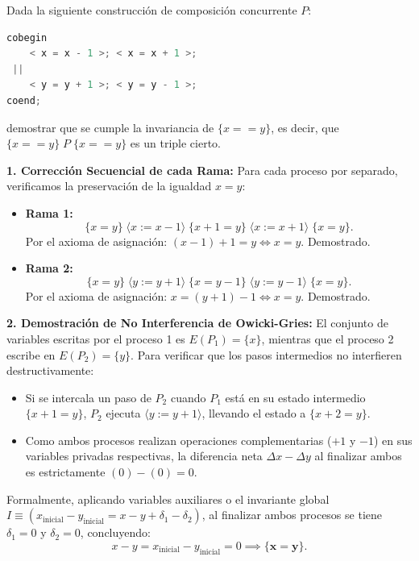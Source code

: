 \begin{ejercicio}
Dada la siguiente construcción de composición concurrente $P$:
\begin{lstlisting}[language=C++]
cobegin
    < x = x - 1 >; < x = x + 1 >;
 ||
    < y = y + 1 >; < y = y - 1 >;
coend;
\end{lstlisting}
demostrar que se cumple la invariancia de $\{x == y\}$, es decir, que $\{x == y\} \; P \; \{x == y\}$ es un triple cierto.
\end{ejercicio}

\begin{solucion}
\textbf{1. Corrección Secuencial de cada Rama:}
Para cada proceso por separado, verificamos la preservación de la igualdad $x = y$:
\begin{itemize}
    \item \textbf{Rama 1:}
    \[
    \{x = y\} \; \langle x := x - 1 \rangle \; \{x + 1 = y\} \; \langle x := x + 1 \rangle \; \{x = y\}.
    \]
    Por el axioma de asignación: $(x - 1) + 1 = y \iff x = y$. Demostrado.
    \item \textbf{Rama 2:}
    \[
    \{x = y\} \; \langle y := y + 1 \rangle \; \{x = y - 1\} \; \langle y := y - 1 \rangle \; \{x = y\}.
    \]
    Por el axioma de asignación: $x = (y + 1) - 1 \iff x = y$. Demostrado.
\end{itemize}

\textbf{2. Demostración de No Interferencia de Owicki-Gries:}
El conjunto de variables escritas por el proceso 1 es $E(P_1) = \{x\}$, mientras que el proceso 2 escribe en $E(P_2) = \{y\}$.
Para verificar que los pasos intermedios no interfieren destructivamente:
\begin{itemize}
    \item Si se intercala un paso de $P_2$ cuando $P_1$ está en su estado intermedio $\{x + 1 = y\}$, $P_2$ ejecuta $\langle y := y + 1 \rangle$, llevando el estado a $\{x + 2 = y\}$.
    \item Como ambos procesos realizan operaciones complementarias ($+1$ y $-1$) en sus variables privadas respectivas, la diferencia neta $\Delta x - \Delta y$ al finalizar ambos es estrictamente $(0) - (0) = 0$.
\end{itemize}
Formalmente, aplicando variables auxiliares o el invariante global $I \equiv (x_{\text{inicial}} - y_{\text{inicial}} = x - y + \delta_1 - \delta_2)$, al finalizar ambos procesos se tiene $\delta_1 = 0$ y $\delta_2 = 0$, concluyendo:
\[
x - y = x_{\text{inicial}} - y_{\text{inicial}} = 0 \implies \mathbf{\{x = y\}}.
\]
\end{solucion}

